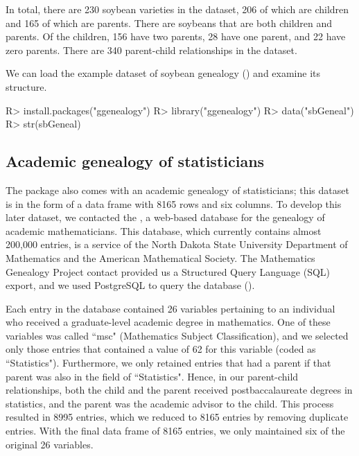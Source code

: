 \documentclass[article,shortnames]{jss}
\begin{document}
In total, there are 230 soybean varieties in the dataset, 206 of which are children and 165 of which are parents. There are soybeans that are both children and parents. Of the children, 156 have two parents, 28 have one parent, and 22 have zero parents. There are 340 parent-child relationships in the dataset.

We can load the example dataset of soybean genealogy () and examine its structure. 

\begin{CodeChunk}
\begin{CodeInput}
R> install.packages("ggenealogy")
R> library("ggenealogy")
R> data("sbGeneal")
R> str(sbGeneal)
\end{CodeInput}
\end{CodeChunk}
\subsection{Academic genealogy of statisticians}
The  package also comes with an academic genealogy of statisticians; this dataset is in the form of a data frame with 8165 rows and six columns. To develop this later dataset, we contacted the \citealt{mgp}, a web-based database for the genealogy of academic mathematicians. This database, which currently contains almost 200,000 entries, is a service of the North Dakota State University Department of Mathematics and the American Mathematical Society. The Mathematics Genealogy Project contact provided us a Structured Query Language (SQL) export, and we used PostgreSQL to query the database (\citealt{psql}).

Each entry in the database contained 26 variables pertaining to an individual who received a graduate-level academic degree in mathematics. One of these variables was called ``msc" (Mathematics Subject Classification), and we selected only those entries that contained a value of 62 for this variable (coded as ``Statistics"). Furthermore, we only retained entries that had a parent if that parent was also in the field of ``Statistics". Hence, in our parent-child relationships, both the child and the parent received postbaccalaureate degrees in statistics, and the parent was the academic advisor to the child. This process resulted in 8995 entries, which we reduced to 8165 entries by removing duplicate entries. With the final data frame of 8165 entries, we only maintained six of the original 26 variables. 
\end{document}
